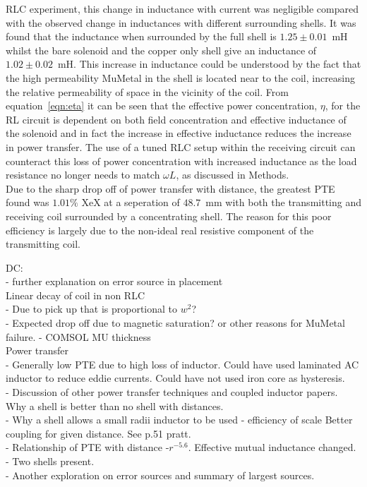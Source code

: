 \documentclass[11pt]{iopart}
\begin{document}
RLC experiment, this change in inductance with current was negligible
compared with the observed change in inductances with different
surrounding shells. It was found that the inductance when surrounded
by the full shell is $1.25\pm0.01$~mH whilst the bare solenoid and the
copper only shell give an inductance of $1.02\pm0.02$~mH. This
increase in inductance could be understood by the fact that the high
permeability MuMetal in the shell is located near to the coil,
increasing the relative permeability of space in the vicinity of the
coil. From equation~\ref{eqn:eta} it can be seen that the effective
power concentration, $\eta$, for the RL circuit is dependent on both
field concentration and effective inductance of the solenoid and in
fact the increase in effective inductance reduces the increase in
power transfer. The use of a tuned RLC setup within the receiving
circuit can counteract this loss of power concentration with increased
inductance as the load resistance no longer needs to match $\omega L$,
as discussed in Methods.\\

Due to the sharp drop off of power transfer with distance, the
greatest PTE found was $1.01\%$ XeX at a seperation of $48.7$~mm with
both the transmitting and receiving coil surrounded by a concentrating
shell. The reason for this poor efficiency is largely due to the
non-ideal real resistive component of the transmitting coil.


DC:  \\
- further explanation on error source in placement \\

Linear decay of coil in non RLC \\
- Due to pick up that is proportional to $w^2$? \\
- Expected drop off due to magnetic saturation? or other reasons for
MuMetal failure. - COMSOL MU thickness \\

Power transfer \\
- Generally low PTE due to high loss of inductor.  Could have used
laminated AC inductor to reduce eddie currents.  Could have not used
iron core as hysteresis. \\
- Discussion of other power transfer techniques and coupled inductor
papers. Why a shell is better than no shell with distances. \\
- Why a shell allows a small radii inductor to be used - efficiency of scale
Better coupling for given distance. See p.51 pratt. \\
- Relationship of PTE with distance -$r^{-5.6}$. Effective mutual
inductance changed. \\
- Two shells present. \\
- Another exploration on error sources and summary of largest
sources.\\
\end{document}
